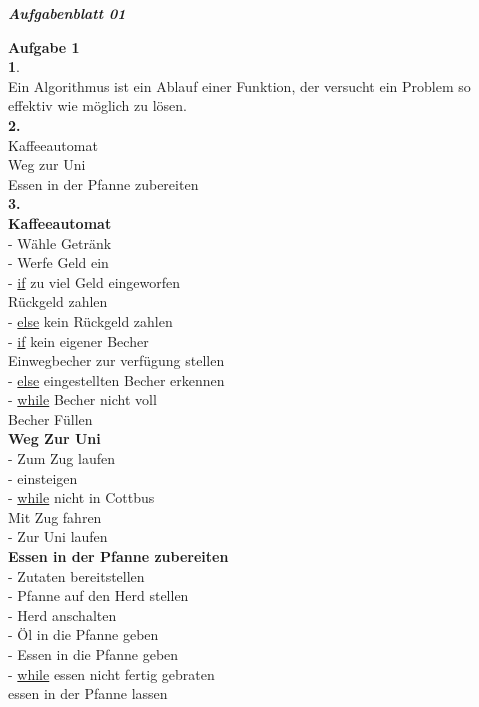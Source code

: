 \documentclass[a4paper, 12pt, ngerman]{article}
\begin{document}
	\begin{center} 
	\textbf{\textsl{Aufgabenblatt 01}}\\
	\end{center}
\textbf {Aufgabe 1}\\
\textbf1. \\
Ein Algorithmus ist ein Ablauf einer Funktion, der versucht ein Problem so effektiv wie
möglich zu lösen.\\
\textbf{2.} \\
Kaffeeautomat\\
Weg zur Uni\\
Essen in der Pfanne zubereiten\\
\textbf{3.}\\
\textbf{Kaffeeautomat}\\
- Wähle Getränk\\
- Werfe Geld ein\\
- \underline{if} zu viel Geld eingeworfen\\ 
 	\hspace*{1cm}Rückgeld zahlen\\
- \underline{else} kein Rückgeld zahlen \\
- \underline{if} kein eigener Becher\\
	\hspace*{1cm}Einwegbecher zur verfügung stellen\\
- \underline{else} eingestellten Becher erkennen\\
- \underline{while} Becher nicht voll\\
 	\hspace*{1cm}Becher Füllen\\

\noindent\textbf{Weg Zur Uni}\\
- Zum Zug laufen\\
- einsteigen\\
- \underline{while} nicht in Cottbus\\
 	\hspace*{1cm}Mit Zug fahren\\
- Zur Uni laufen\\

\noindent\textbf{Essen in der Pfanne zubereiten}\\
- Zutaten bereitstellen\\
- Pfanne auf den Herd stellen\\
- Herd anschalten\\
- Öl in die Pfanne geben\\
- Essen in die Pfanne geben\\
- \underline{while} essen nicht fertig gebraten\\
 	\hspace*{1cm}essen in der Pfanne lassen\\
\newpage
\end{document}
